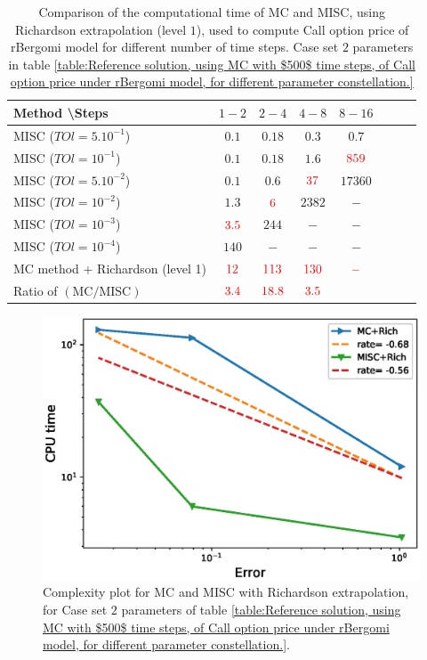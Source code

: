 \documentclass[11pt]{article}
\begin{document}
\begin{table}[h!]
	\centering
	\begin{tabular}{l*{6}{c}r}
		Method \textbackslash  Steps            & $1-2$ & $2-4$ & $4-8$ & $8-16$ &   \\
		\hline
		MISC ($TOl=5.10^{-1}$)  & $0.1$ & $0.18$ & $0.3$ & $0.7$  \\
		MISC ($TOl=10^{-1}$)  & $0.1$ & $0.18$ & $1.6$ & ${\color{red}859}$  \\
		MISC ($TOl=5.10^{-2}$)  & $0.1$ & $0.6$ & ${\color{red}37}$ & $17360$  \\
		MISC ($TOl=10^{-2}$)  & $1.3$ & ${\color{red}6}$ & $2382$ & $-$  \\
		MISC ($TOl=10^{-3}$)  & ${\color{red}3.5}$ & $ 244$ & $-$ & $-$  \\
		
			MISC ($TOl=10^{-4}$)  & $140$ & $-$ & $-$ & $-$  \\
		\hline	
		MC method + Richardson (level 1)  &${\color{red}12}$ & ${\color{red}113}$  & ${\color{red}130}$  & ${\color{red}-}$ \\
	
		\hline	
		Ratio of $\left(\text{MC}/ \text{MISC} \right)$  &$\red{ 3.4
		}$ & $\red{     18.8
		}$  & $\red{ 3.5}
		$  & $$ \\
		\hline
	\end{tabular}
	\caption{Comparison of the computational time of  MC and MISC, using Richardson extrapolation (level $1$), used to compute Call option price of rBergomi model for different number of time steps. Case set $2$ parameters in table \ref{table:Reference solution, using MC with $500$ time steps, of Call option price under rBergomi model, for different parameter constellation.}}
	\label{Comparsion of the computational time of  MC and MISC, using Richardson extrapolation (level $1$), used to compute Call option price of rBergomi model for different number of time steps. Case set $2$ parameters,linear}
\end{table}



\begin{figure}[h!]
\centering
\includegraphics[width=0.7\linewidth]{./figures/rBergomi_Complexity_rates/set2/error_vs_time_set2_rich_linear}

\caption{Complexity plot for  MC and MISC with Richardson extrapolation, for Case set $2$ parameters of table \ref{table:Reference solution, using MC with $500$ time steps, of Call option price under rBergomi model, for different parameter constellation.}.}
\label{fig:Complexity plot for MC and MISC for Case set $2$ parameters, richardson,linear}
\end{figure}
\end{document}
